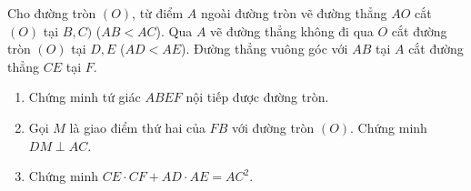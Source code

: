 \begin{ex}%
Cho đường tròn $(O)$, từ điểm $A$ ngoài đường tròn vẽ đường thẳng $AO$ cắt $(O)$ tại $B, C)$ ($AB < AC$). Qua $A$ vẽ đường thẳng không đi qua $O$ cắt đường tròn $(O)$ tại $D, E$ ($AD < AE$). Đường thẳng vuông góc với $AB$ tại $A$ cắt đường thẳng $CE$ tại $F$.
\begin{enumerate}
\item Chứng minh tứ giác $ABEF$ nội tiếp được đường tròn.
\item Gọi $M$ là giao điểm thứ hai của $FB$ với đường tròn $(O)$. Chứng minh $DM \perp AC$.
\item Chứng minh $CE \cdot CF + AD \cdot AE = AC^2$.
\end{enumerate}
\end{ex}

